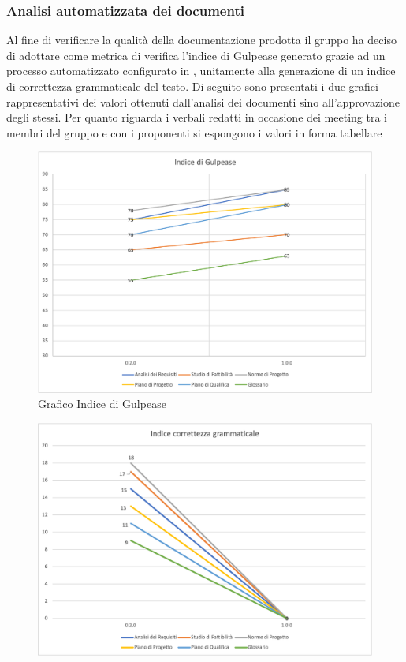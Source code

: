 \subsubsection{Analisi automatizzata dei documenti}
Al fine di verificare la qualità della documentazione prodotta il gruppo ha deciso di adottare come metrica di verifica
l'indice di Gulpease generato grazie ad un processo automatizzato configurato in \textit{}, unitamente alla generazione di un indice di
correttezza grammaticale del testo.
Di seguito sono presentati i due grafici rappresentativi dei valori ottenuti dall'analisi dei documenti sino all'approvazione degli stessi.
Per quanto riguarda i verbali redatti in occasione dei meeting tra i membri del gruppo e con i proponenti si espongono i valori in forma tabellare
\begin{center}
    \begin{figure}[!htb]
        \centering
        \includegraphics[scale=0.80]{res/images/grafico_gulpease.png}
        \caption{Grafico Indice di Gulpease}
    \end{figure}
    \begin{figure}[!htb]
        \centering
        \includegraphics[scale=0.80]{res/images/grafico_correttezza.png}

\end{figure}
\end{center}
